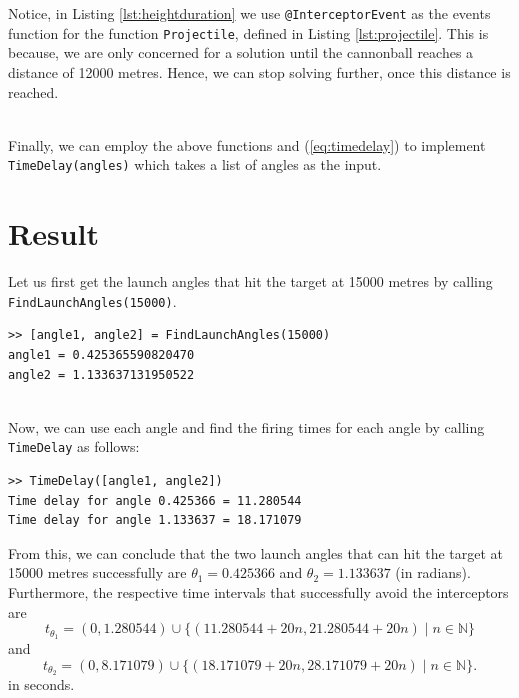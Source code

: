 \documentclass[11pt]{report}
\begin{document}


Notice, in Listing \ref{lst:heightduration} we use \texttt{@InterceptorEvent} as the events function for the function \texttt{Projectile}, defined in Listing \ref{lst:projectile}. This is because, we are only concerned for a solution until the cannonball reaches a distance of 12000 metres. Hence, we can stop solving further, once this distance is reached.


\ \\
Finally, we can employ the above functions and (\ref{eq:timedelay}) to implement \texttt{TimeDelay(angles)} which takes a list of angles as the input. \\



\section{Result}
Let us first get the launch angles that hit the target at 15000 metres by calling \texttt{FindLaunchAngles(15000)}.

\begin{lstlisting}[title={Firing Angles (in radians) to hit target at 15000m.}]
>> [angle1, angle2] = FindLaunchAngles(15000)
angle1 = 0.425365590820470
angle2 = 1.133637131950522
\end{lstlisting}

\ \\
Now, we can use each angle and find the firing times for each angle by calling \texttt{TimeDelay} as follows:

\begin{lstlisting}[title={Time delays for both firing angles.}]
>> TimeDelay([angle1, angle2])
Time delay for angle 0.425366 = 11.280544
Time delay for angle 1.133637 = 18.171079
\end{lstlisting}

From this, we can conclude that the two launch angles that can hit the target at 15000 metres successfully are $\theta_1 = 0.425366$ and $\theta_2 = 1.133637$ (in radians). Furthermore, the respective time intervals that successfully avoid the interceptors are
 $$t_{\theta_1} = (0, 1.280544) \cup \{(11.280544 + 20n, 21.280544 + 20n) \mid n \in \mathbb{N}\}$$ 
 and
 $$t_{\theta_2} = (0, 8.171079) \cup  \{(18.171079 + 20n, 28.171079 + 20n) \mid n \in \mathbb{N}\}.$$
 in seconds.
\end{document}
